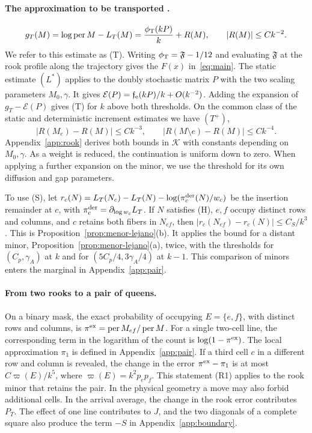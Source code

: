 \paragraph{The approximation to be transported .}
\[
   g_T(M)=\log\operatorname{per}M-L_T(M)
       =\frac{\phi_{\mathrm T}(kP)}k+R(M),\qquad |R(M)|\le Ck^{-2}.
\]
We refer to this estimate as (T). Writing $\phi_{\mathrm T}=\mathfrak F-1/12$ and evaluating $\mathfrak F$
at the rook profile along the trajectory gives the $F(x)$ in~\eqref{eq:main}. The static estimate
$(L^*)$ applies to the doubly stochastic matrix $P$ with the two scaling parameters $M_0,\gamma$.
It gives $\mathcal E(P)=\mathfrak f_{\rm e}(kP)/k+O(k^{-2})$. Adding the expansion of
$g_T-\mathcal E(P)$ gives (T) for $k$ above both thresholds. On the common class of the static and
deterministic increment estimates we have $(T^+)$,
\[
 |R(M_e)-R(M)|\le Ck^{-3},\qquad |R(M\setminus e)-R(M)|\le Ck^{-4}.
\]
Appendix~\ref{app:rook} derives both bounds in $\mathcal K$ with constants depending on
$M_0,\gamma$. As a weight is reduced, the continuation is uniform down to zero. When applying a
further expansion on the minor, we use the threshold for its own diffusion and gap parameters.

To use (S), let $r_c(N)=L_T(N_c)-L_T(N)-\log(\pi_c^{\rm der}(N)/w_c)$ be the insertion remainder
at $c$, with $\pi_c^{\rm der}=\partial_{\log w_c}L_T$. If $N$ satisfies (H), $e,f$ occupy distinct
rows and columns, and $c$ retains both fibers in $N_{ef}$, then $|r_c(N_{ef})-r_c(N)|\le C_S/k^3$.
This is Proposition~\ref{prop:menor-lejano}(b). It applies the bound for a distant minor,
Proposition~\ref{prop:menor-lejano}(a), twice, with the thresholds for $(C_p,\gamma_A)$ at $k$ and for
$(5C_p/4,3\gamma_A/4)$ at $k-1$. This comparison of minors enters the marginal in
Appendix~\ref{app:pair}.

\paragraph{From two rooks to a pair of queens.}
On a binary mask, the exact probability of occupying $E=\{e,f\}$, with distinct rows and columns,
is $\pi^{\rm ex}=\operatorname{per}M_{ef}/\operatorname{per}M$. For a single two-cell line, the
corresponding term in the logarithm of the count is $\log(1-\pi^{\rm ex})$. The local
approximation $\pi_1$ is defined in Appendix~\ref{app:pair}. If a third cell $c$ in a different
row and column is revealed, the change in the error $\pi^{\rm ex}-\pi_1$ is at most
$C\varpi(E)/k^5$, where $\varpi(E)=k^2p_ep_f$. This statement (R1) applies to the rook minor that
retains the pair. In the physical geometry a move may also forbid additional cells. In the arrival
average, the change in the rook error contributes $P_T$. The effect of one line contributes to
$J$, and the two diagonals of a complete square also produce the term $-S$ in
Appendix~\ref{app:boundary}.

